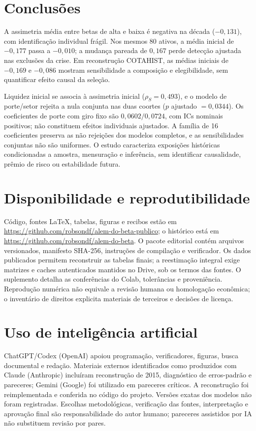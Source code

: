\section{Conclusões}
A assimetria média entre betas de alta e baixa é negativa na década
($-0,131$), com identificação individual frágil. Nos mesmos 80 ativos,
a média inicial de $-0,177$ passa a $-0,010$; a mudança pareada de $0,167$
perde detecção ajustada nas exclusões da crise. Em reconstrução COTAHIST,
as médias iniciais de $-0,169$ e $-0,086$ mostram sensibilidade a composição
e elegibilidade, sem quantificar efeito causal da seleção.

Liquidez inicial se associa à assimetria inicial ($\rho_S=0,493$), e o
modelo de porte/setor rejeita a nula conjunta nas duas coortes
($p$ ajustado $=0,0344$). Os coeficientes de porte com giro fixo são
$0,0602/0,0724$, com ICs nominais positivos; não constituem efeitos
individuais ajustados. A família de 16 coeficientes preserva as não rejeições
dos modelos completos, e as sensibilidades conjuntas não são uniformes.
O estudo caracteriza exposições históricas condicionadas a amostra,
mensuração e inferência, sem identificar causalidade, prêmio de risco ou
estabilidade futura.

\section*{Disponibilidade e reprodutibilidade}
Código, fontes LaTeX, tabelas, figuras e recibos estão em
\url{https://github.com/robsondf/alem-do-beta-publico}; o histórico está em
\url{https://github.com/robsondf/alem-do-beta}.
O pacote editorial contém arquivos versionados, manifesto SHA-256,
instruções de compilação e verificador. Os dados publicados permitem
reconstruir as tabelas finais; a reestimação integral exige matrizes e caches
autenticados mantidos no Drive, sob os termos das fontes.
O suplemento detalha as conferências do Colab, tolerâncias e proveniência.
Reprodução numérica não equivale a revisão humana ou homologação econômica;
o inventário de direitos explicita materiais de terceiros e decisões de licença.

\section*{Uso de inteligência artificial}
ChatGPT/Codex (OpenAI) apoiou programação, verificadores, figuras, busca
documental e redação. Materiais externos identificados como produzidos com
Claude (Anthropic) incluíram reconstrução de 2015, diagnóstico de erros-padrão
e pareceres; Gemini (Google) foi utilizado em pareceres críticos.
A reconstrução foi reimplementada e conferida no código do projeto.
Versões exatas dos modelos não foram registradas. Escolhas metodológicas,
verificação das fontes, interpretação e aprovação final são responsabilidade
do autor humano; pareceres assistidos por IA não substituem revisão por pares.
